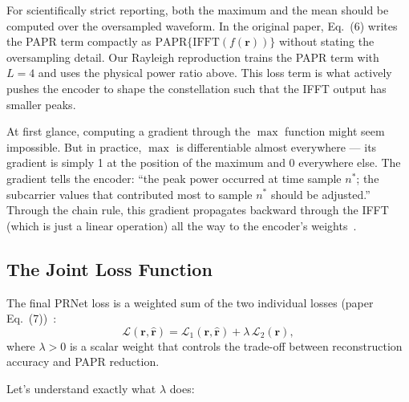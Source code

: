 For scientifically strict reporting, both the maximum and the mean should be
computed over the oversampled waveform.  In the original paper, Eq.~(6) writes
the PAPR term compactly as $\mathrm{PAPR}\{\mathrm{IFFT}(f(\bm{r}))\}$ without
stating the oversampling detail.  Our Rayleigh reproduction trains the PAPR
term with $L=4$ and uses the physical power ratio above.  This loss term is
what actively pushes the encoder to shape the constellation such that the IFFT
output has smaller peaks.

\begin{keyinsight}
    At first glance, computing a gradient through the $\max$ function
    might seem impossible.  But in practice, $\max$ is differentiable
    almost everywhere --- its gradient is simply 1 at the position of the
    maximum and 0 everywhere else.  The gradient tells the encoder:
    ``the peak power occurred at time sample $n^*$; the subcarrier
    values that contributed most to sample $n^*$ should be adjusted.''
    Through the chain rule, this gradient propagates backward through
    the IFFT (which is just a linear operation) all the way to the
    encoder's weights~\cite{kim2017novel}.
\end{keyinsight}


\subsection{The Joint Loss Function}

The final PRNet loss is a weighted sum of the two individual losses
(paper Eq.~(7))~\cite{kim2017novel}:
\begin{equation}
    \boxed{\mathcal{L}(\bm{r},\hat{\bm{r}})
    = \mathcal{L}_1(\bm{r},\hat{\bm{r}}) + \lambda\,\mathcal{L}_2(\bm{r}),}
    \label{eq:prnet_loss}
\end{equation}
where $\lambda > 0$ is a scalar weight that controls the trade-off between
reconstruction accuracy and PAPR reduction.

Let's understand exactly what $\lambda$ does:

